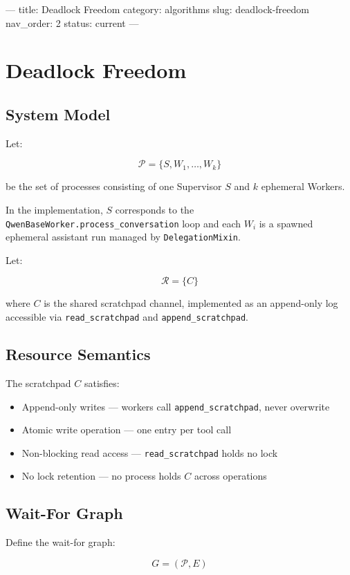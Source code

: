 ---
title: Deadlock Freedom
category: algorithms
slug: deadlock-freedom
nav_order: 2
status: current
---

\section{Deadlock Freedom}

\subsection*{System Model}

Let:

\[ \mathcal{P} = \{ S, W_1, \dots, W_k \} \]

be the set of processes consisting of one Supervisor $S$ and $k$ ephemeral Workers.

In the implementation, $S$ corresponds to the \texttt{QwenBaseWorker.process\_conversation}
loop and each $W_i$ is a spawned ephemeral assistant run managed by \texttt{DelegationMixin}.

Let:

\[ \mathcal{R} = \{ C \} \]

where $C$ is the shared scratchpad channel, implemented as an append-only log
accessible via \texttt{read\_scratchpad} and \texttt{append\_scratchpad}.

\subsection*{Resource Semantics}

The scratchpad $C$ satisfies:

\begin{itemize}
  \item Append-only writes — workers call \texttt{append\_scratchpad}, never overwrite
  \item Atomic write operation — one entry per tool call
  \item Non-blocking read access — \texttt{read\_scratchpad} holds no lock
  \item No lock retention — no process holds $C$ across operations
\end{itemize}

\subsection*{Wait-For Graph}

Define the wait-for graph:

\[ G = (\mathcal{P}, E) \]

